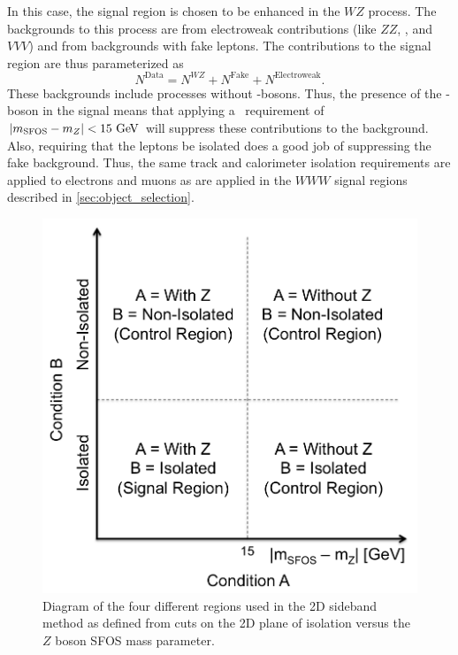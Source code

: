 In this case, the signal region is chosen to be enhanced in the $WZ$ process.
The backgrounds to this process are from electroweak contributions (like
$ZZ$, \ttV, and $VVV$) and from backgrounds with fake leptons.
The contributions to the signal region are thus parameterized as
\begin{equation}
\label{eq:wzparam}
N^{\textrm{Data}} =  N^{WZ} + N^{\textrm{Fake}} + N^{\textrm{Electroweak}}.
\end{equation}
These backgrounds include processes without \z-bosons.
Thus, the presence of the \z-boson in the signal means that 
applying a \z~requirement of 
$|m_{\textrm{SFOS}}-m_{\z}|<15\GeV$
will suppress these contributions to the background.
Also, requiring that the leptons be isolated does a good job of 
suppressing the fake background.
Thus, the same track and calorimeter isolation requirements
are applied to electrons and muons as are applied in the $WWW$ signal regions
described in \sec\ref{sec:object_selection}.



\begin{figure}[ht]
\centering
\includegraphics[width=.6\textwidth]{figures/abcd.png}
\caption{Diagram of the four different regions used in the 2D sideband method
as defined from cuts on the 2D plane of isolation versus the
$Z$ boson SFOS mass parameter.}
\label{fig:abcd_diagram}
\end{figure}

